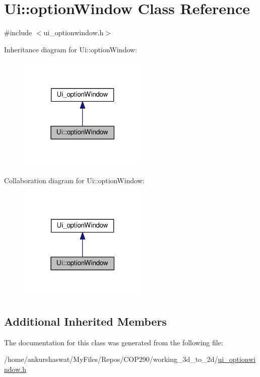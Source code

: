 \hypertarget{classUi_1_1optionWindow}{}\section{Ui\+:\+:option\+Window Class Reference}
\label{classUi_1_1optionWindow}


{\ttfamily \#include $<$ui\+\_\+optionwindow.\+h$>$}



Inheritance diagram for Ui\+:\+:option\+Window\+:
\nopagebreak
\begin{figure}[H]
\begin{center}
\leavevmode
\includegraphics[width=174pt]{classUi_1_1optionWindow__inherit__graph}
\end{center}
\end{figure}


Collaboration diagram for Ui\+:\+:option\+Window\+:
\nopagebreak
\begin{figure}[H]
\begin{center}
\leavevmode
\includegraphics[width=174pt]{classUi_1_1optionWindow__coll__graph}
\end{center}
\end{figure}
\subsection*{Additional Inherited Members}


The documentation for this class was generated from the following file\+:\begin{DoxyCompactItemize}
\item 
/home/ankurshaswat/\+My\+Files/\+Repos/\+C\+O\+P290/working\+\_\+3d\+\_\+to\+\_\+2d/\hyperlink{ui__optionwindow_8h}{ui\+\_\+optionwindow.\+h}\end{DoxyCompactItemize}
